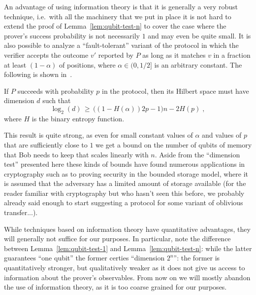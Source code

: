 An advantage of using information theory is that it is generally a very robust technique, i.e.\ with all the machinery that we put in place it is not hard to extend the proof of Lemma~\ref{lem:qubit-test-n} to cover the case where the prover's success probability is not necessarily $1$ and may even be quite small. It is also possible to analyze a ``fault-tolerant'' variant of the protocol in which the verifier accepts the outcome $v'$ reported by $P$ as long as it matches $v$ in a fraction at least $(1-\alpha)$ of positions, where $\alpha \in (0,1/2]$ is an arbitrary constant.  The following is shown in~\cite{chao2020quantum}. 

\begin{theorem}
If $P$ succeeds with probability $p$ in the protocol, then its Hilbert space must have dimension $d$ such that 
\[ \log_2(d) \,\geq\, \big((1-H(\alpha))2p-1\big)n - 2 H(p)\;,\]
where $H$ is the binary entropy function. 
\end{theorem}

This result is quite strong, as even for small constant values of $\alpha$ and values of $p$ that are sufficiently close to $1$ we get a bound on the number of qubits of memory that Bob needs to keep that scales linearly with $n$. Aside from the ``dimension test'' presented here these kinds of bounds have found numerous applications in cryptography such as to proving security in the bounded storage model, where it is assumed that the adversary has a limited amount of storage available  (for the reader familiar with cryptography but who hasn't seen this before, we probably already said enough to start suggesting a protocol for some variant of oblivious transfer...). 

While techniques based on information theory have quantitative advantages, they will generally not suffice for our purposes. In particular, note the difference between Lemma~\ref{lem:qubit-test-1} and Lemma~\ref{lem:qubit-test-n}: while the latter guarantees ``one qubit'' the former certies ``dimension $2^n$'': the former is quantitatively stronger, but qualitatively weaker as it does not give us access to information about the prover's observables. From now on we will mostly abandon the use of information theory, as it is too coarse grained for our purposes. 
